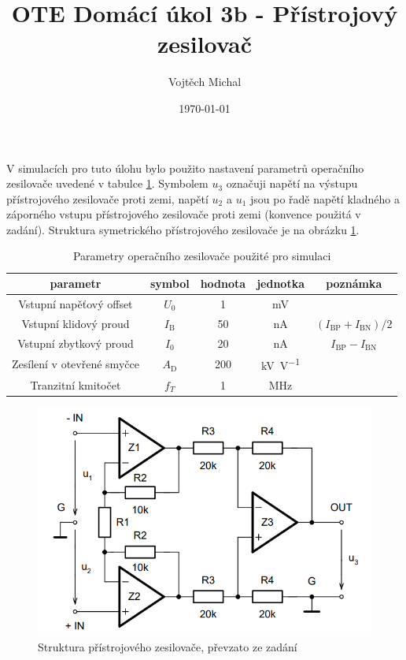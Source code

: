 \documentclass[twoside]{article}
\title{OTE Domácí úkol 3b - Přístrojový zesilovač}
\author{Vojtěch Michal}
\date{\today}
\begin{document}
\maketitle

V simulacích pro tuto úlohu bylo použito nastavení parametrů operačního zesilovače uvedené v tabulce \ref{tab:oz_param}.
Symbolem $u_3$ označuji napětí na výstupu přístrojového zesilovače proti zemi,
napětí $u_2$ a $u_1$ jsou po řadě napětí kladného a záporného vstupu přístrojového zesilovače proti zemi
(konvence použitá v zadání). Struktura symetrického přístrojového zesilovače je na obrázku \ref{fig:instrument_amp}.

\begin{table}[h!]
    \centering
    \begin{tabular}{c|c|c|c|c}
        parametr & symbol & hodnota & jednotka & poznámka\\
        \hline
        Vstupní napěťový offset & $U_0$ & 1 & \si{\milli\volt} & \\
        Vstupní klidový proud & $I_\text{B}$ & 50 & \si{\nano\ampere} & $(I_\text{BP} + I_\text{BN})/2$ \\
        Vstupní zbytkový proud & $I_0$ & 20 & \si{\nano\ampere} & $I_\text{BP} - I_\text{BN}$ \\
        Zesílení v otevřené smyčce & $A_\text{D}$ & 200 & \si{\kilo\volt\per\volt} & \\
        Tranzitní kmitočet& $f_T$ & 1 & \si{\mega\hertz} &
    \end{tabular}
    \caption{Parametry operačního zesilovače použité pro simulaci}
    \label{tab:oz_param}
\end{table}

\begin{figure}[h!]
    \centering
    \includegraphics[width=0.8\linewidth]{instrumentation_amp.png}
    \caption{Struktura přístrojového zesilovače, převzato ze zadání}
    \label{fig:instrument_amp}
\end{figure}
\end{document}
